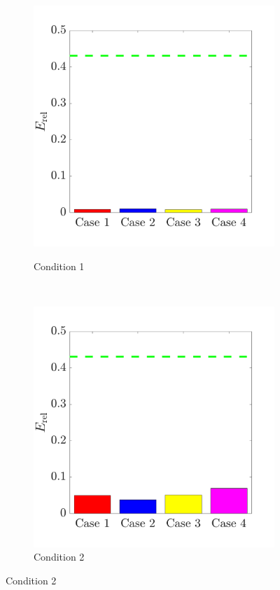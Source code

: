 \documentclass{jov}
\begin{document}
\begin{figure}
\centering
\begin{subfigure}{0.22 \textwidth}
	\caption{Condition 1}
	\includegraphics[width=\textwidth]{../FiguresDraft4/Figure15/Figure15_a.pdf}
	\label{fig:case1Bar}
    \end{subfigure}
    ~ 
    \begin{subfigure}{0.22 \textwidth}   
	\caption{Condition 2}
	\includegraphics[width=\textwidth]{../FiguresDraft4/Figure15/Figure15_b.pdf}

\end{subfigure}
\end{figure}
\end{document}
